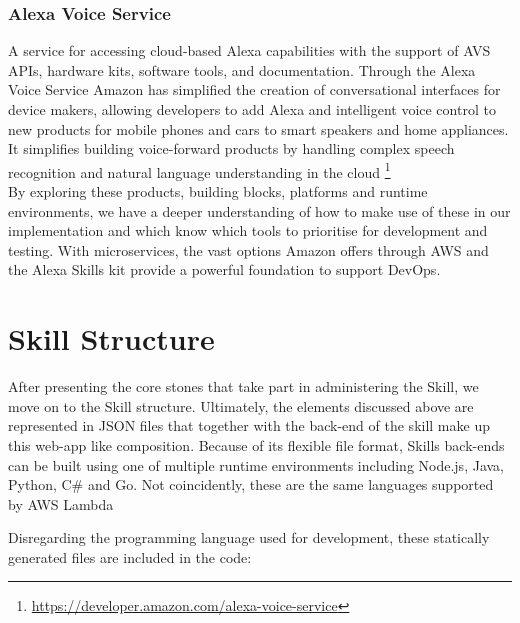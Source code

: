 		
		\subsubsection*{Alexa Voice Service} %
		 A service for accessing cloud-based Alexa capabilities with the support of AVS APIs, hardware kits, software tools, and documentation. Through the Alexa Voice Service Amazon has simplified the creation of conversational interfaces for device makers, allowing developers to add Alexa and intelligent voice control to new products for mobile phones and cars to smart speakers and home appliances.
		 It simplifies building voice-forward products by handling complex speech recognition and natural language understanding in the cloud \footnote{\url{https://developer.amazon.com/alexa-voice-service}}\\



By exploring these products, building blocks, platforms and runtime environments, we have a deeper understanding of how to make use of these in our implementation and which know which tools to prioritise for development and testing. With microservices, the vast options Amazon offers through AWS and the Alexa Skills kit provide a powerful foundation to support DevOps.
	


\section{Skill Structure}


After presenting the core stones that take part in administering the Skill, we move on to the Skill structure. Ultimately, the elements discussed above are represented in JSON files that together with the back-end of the skill make up this web-app like composition. Because of its flexible file format, Skills back-ends can be built using one of multiple runtime environments including Node.js, Java, Python, C\# and Go. 
Not coincidently, these are the same languages supported by AWS Lambda %

Disregarding the programming language used for development, these statically generated files are included in the code:



